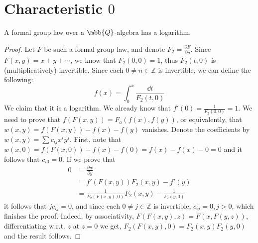 \section{Characteristic $0$}

\begin{theorem*}
	A formal group law over a $\mbb{Q}$-algebra has a logarithm.
\end{theorem*}

\begin{proof}
	Let $F$ be such a formal group law, and denote $F_2 = \frac{\partial F}{\partial y}$.
	Since $F\left(x,y\right) = x+y+\cdots$, we know that $F_2\left(0,0\right) = 1$, thus $F_2\left(t,0\right)$ is (multiplicatively) invertible.
	Since each $0 \neq n \in \mathbb{Z}$ is invertible, we can define the following:
	$$ f\left(x\right) = \int_0^x \frac{\dd{t}}{F_2\left(t,0\right)} $$
	We claim that it is a logarithm.
	We already know that $f'\left(0\right) = \frac{1}{F_2\left(0,0\right)} = 1$.
	We need to prove that
	$f\left(F\left(x,y\right)\right) = F_a\left(f\left(x\right),f\left(y\right)\right)$,
	or equivalently, that
	$w\left(x,y\right) = f\left(F\left(x,y\right)\right) - f\left(x\right) - f\left(y\right)$ vanishes.
	Denote the coefficients by $w\left(x,y\right) = \sum c_{ij} x^i y^j$.
	First, note that
	$
		w\left(x,0\right)
		= f\left(F\left(x,0\right)\right) - f\left(x\right) - f\left(0\right)
		= f\left(x\right) - f\left(x\right) - 0
		= 0
	$
	and it follows that $c_{i0} = 0$.
	If we prove that
	\begin{align*}
		0
		&= \frac{\partial w}{\partial y}\\
		&= f'\left(F\left(x,y\right)\right) F_2\left(x,y\right) - f'\left(y\right)\\
		&= \frac{1}{F_2\left(F\left(x,y\right),0\right)} F_2\left(x,y\right) - \frac{1}{F_2\left(y,0\right)}
	\end{align*}
	it follows that $j c_{ij} = 0$, and since each $0 \neq j \in \mathbb{Z}$ is invertible, $c_{ij} = 0, j > 0$, which finishes the proof.
	Indeed, by associativity,
	$F\left(F\left(x,y\right),z\right)=F\left(x,F\left(y,z\right)\right)$, differentiating w.r.t. $z$ at $z=0$ we get,
	$
		F_2\left(F\left(x,y\right),0\right)
		= F_2\left(x,y\right) F_2\left(y,0\right)
	$
	and the result follows.
\end{proof}